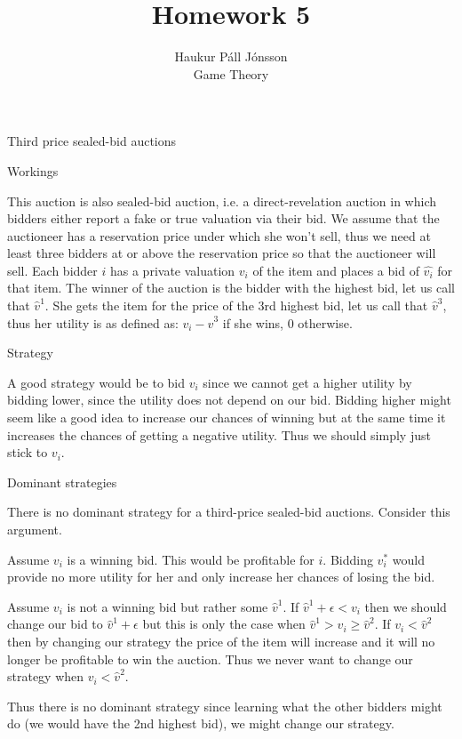 \documentclass[12pt]{article}
\newenvironment{question}[2][Question]{\begin{trivlist}
\item[\hskip \labelsep {\bfseries #1}\hskip \labelsep {\bfseries #2.}]}{\end{trivlist}}
\newenvironment{answer}[2][Answer]{\begin{trivlist}
\item[\hskip \labelsep {\bfseries #1}\hskip \labelsep {\bfseries #2:}]}{\end{trivlist}}
\begin{document}
\let\oldsum\sum
\renewcommand{\sum}[3]{\oldsum\limits_{#1}^{#2}#3}
\let\oldprod\prod
\renewcommand{\prod}[3]{\oldprod\limits_{#1}^{#2}#3}

\title{Homework 5}
\author{Haukur Páll Jónsson\\
Game Theory}

\maketitle

\begin{question}{1}
Third price sealed-bid auctions
\end{question}
\begin{answer}{a)}{Workings}

This auction is also sealed-bid auction, i.e. a direct-revelation auction in which bidders either report a fake or true valuation via their bid. We assume that the auctioneer has a reservation price under which she won't sell, thus we need at least three bidders at or above the reservation price so that the auctioneer will sell. Each bidder $i$ has a private valuation $v_i$ of the item and places a bid of $\hat{v_i}$ for that item. The winner of the auction is the bidder with the highest bid, let us call that $\hat{v}^1$. She gets the item for the price of the 3rd highest bid, let us call that $\hat{v}^3$, thus her utility is as defined as: $v_i-\hat{v}^3$ if she wins, $0$ otherwise.
\end{answer}
\begin{answer}{b)}{Strategy}

A good strategy would be to bid $v_i$ since we cannot get a higher utility by bidding lower, since the utility does not depend on our bid. Bidding higher might seem like a good idea to increase our chances of winning but at the same time it increases the chances of getting a negative utility. Thus we should simply just stick to $v_i$.
\end{answer}
\begin{answer}{c)}{Dominant strategies}

There is no dominant strategy for a third-price sealed-bid auctions. Consider this argument.

Assume $v_i$ is a winning bid. This would be profitable for $i$. Bidding $v_i^*$ would provide no more utility for her and only increase her chances of losing the bid.

Assume $v_i$ is not a winning bid but rather some $\hat{v}^1$. If $\hat{v}^1+\epsilon < v_i$ then we should change our bid to $\hat{v}^1+\epsilon$ but this is only the case when $\hat{v}^1 > v_i \geq \hat{v}^2$. If $v_i < \hat{v}^2$ then by changing our strategy the price of the item will increase and it will no longer be profitable to win the auction. Thus we never want to change our strategy when $v_i < \hat{v}^2$.

Thus there is no dominant strategy since learning what the other bidders might do (we would have the 2nd highest bid), we might change our strategy.
\end{answer}
\end{document}
